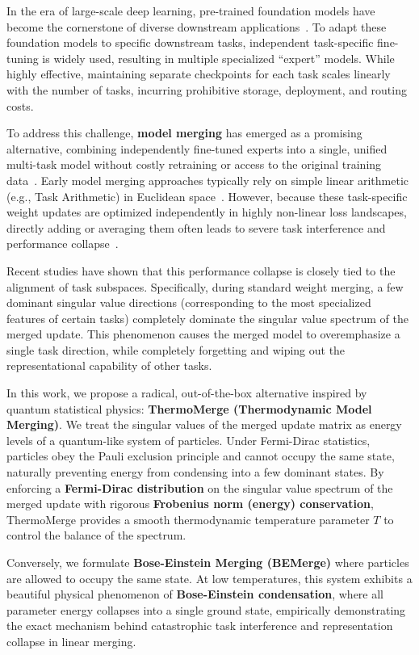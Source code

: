 \documentclass{article}
\theoremstyle{plain}
\theoremstyle{definition}
\theoremstyle{remark}
\begin{document}
In the era of large-scale deep learning, pre-trained foundation models have become the cornerstone of diverse downstream applications~\cite{radford21, he16, davenport20, deng09}. To adapt these foundation models to specific downstream tasks, independent task-specific fine-tuning is widely used, resulting in multiple specialized ``expert'' models. While highly effective, maintaining separate checkpoints for each task scales linearly with the number of tasks, incurring prohibitive storage, deployment, and routing costs. 

To address this challenge, \textbf{model merging} has emerged as a promising alternative, combining independently fine-tuned experts into a single, unified multi-task model without costly retraining or access to the original training data~\cite{wortsman22, ilharco23}. Early model merging approaches typically rely on simple linear arithmetic (e.g., Task Arithmetic) in Euclidean space~\cite{ilharco23, wortsman22, achille19}. However, because these task-specific weight updates are optimized independently in highly non-linear loss landscapes, directly adding or averaging them often leads to severe task interference and performance collapse~\cite{yadav24, du24, daskalakis20}.

Recent studies have shown that this performance collapse is closely tied to the alignment of task subspaces. Specifically, during standard weight merging, a few dominant singular value directions (corresponding to the most specialized features of certain tasks) completely dominate the singular value spectrum of the merged update. This phenomenon causes the merged model to overemphasize a single task direction, while completely forgetting and wiping out the representational capability of other tasks. 

In this work, we propose a radical, out-of-the-box alternative inspired by quantum statistical physics: \textbf{ThermoMerge (Thermodynamic Model Merging)}. We treat the singular values of the merged update matrix as energy levels of a quantum-like system of particles. Under Fermi-Dirac statistics, particles obey the Pauli exclusion principle and cannot occupy the same state, naturally preventing energy from condensing into a few dominant states. By enforcing a \textbf{Fermi-Dirac distribution} on the singular value spectrum of the merged update with rigorous \textbf{Frobenius norm (energy) conservation}, ThermoMerge provides a smooth thermodynamic temperature parameter $T$ to control the balance of the spectrum.

Conversely, we formulate \textbf{Bose-Einstein Merging (BEMerge)} where particles are allowed to occupy the same state. At low temperatures, this system exhibits a beautiful physical phenomenon of \textbf{Bose-Einstein condensation}, where all parameter energy collapses into a single ground state, empirically demonstrating the exact mechanism behind catastrophic task interference and representation collapse in linear merging.
\end{document}
